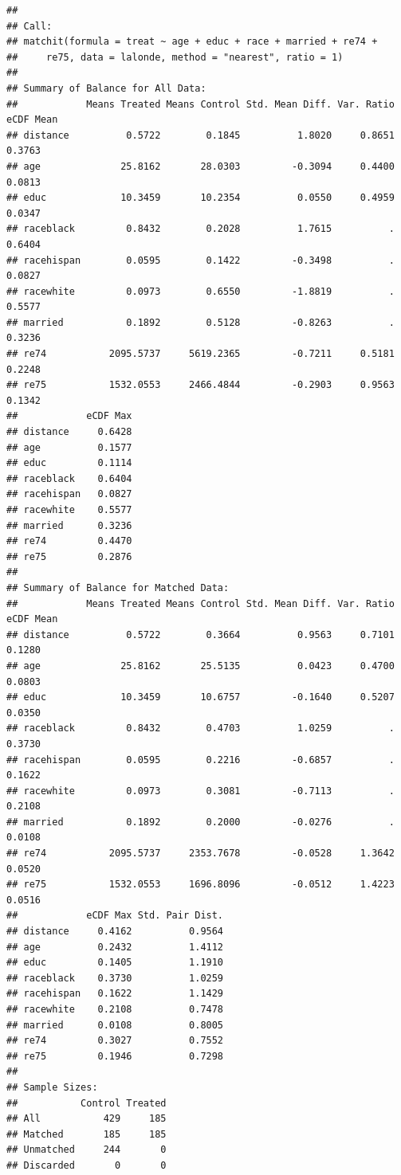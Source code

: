 \documentclass[
]{book}
\begin{document}
\begin{verbatim}
## 
## Call:
## matchit(formula = treat ~ age + educ + race + married + re74 + 
##     re75, data = lalonde, method = "nearest", ratio = 1)
## 
## Summary of Balance for All Data:
##            Means Treated Means Control Std. Mean Diff. Var. Ratio eCDF Mean
## distance          0.5722        0.1845          1.8020     0.8651    0.3763
## age              25.8162       28.0303         -0.3094     0.4400    0.0813
## educ             10.3459       10.2354          0.0550     0.4959    0.0347
## raceblack         0.8432        0.2028          1.7615          .    0.6404
## racehispan        0.0595        0.1422         -0.3498          .    0.0827
## racewhite         0.0973        0.6550         -1.8819          .    0.5577
## married           0.1892        0.5128         -0.8263          .    0.3236
## re74           2095.5737     5619.2365         -0.7211     0.5181    0.2248
## re75           1532.0553     2466.4844         -0.2903     0.9563    0.1342
##            eCDF Max
## distance     0.6428
## age          0.1577
## educ         0.1114
## raceblack    0.6404
## racehispan   0.0827
## racewhite    0.5577
## married      0.3236
## re74         0.4470
## re75         0.2876
## 
## Summary of Balance for Matched Data:
##            Means Treated Means Control Std. Mean Diff. Var. Ratio eCDF Mean
## distance          0.5722        0.3664          0.9563     0.7101    0.1280
## age              25.8162       25.5135          0.0423     0.4700    0.0803
## educ             10.3459       10.6757         -0.1640     0.5207    0.0350
## raceblack         0.8432        0.4703          1.0259          .    0.3730
## racehispan        0.0595        0.2216         -0.6857          .    0.1622
## racewhite         0.0973        0.3081         -0.7113          .    0.2108
## married           0.1892        0.2000         -0.0276          .    0.0108
## re74           2095.5737     2353.7678         -0.0528     1.3642    0.0520
## re75           1532.0553     1696.8096         -0.0512     1.4223    0.0516
##            eCDF Max Std. Pair Dist.
## distance     0.4162          0.9564
## age          0.2432          1.4112
## educ         0.1405          1.1910
## raceblack    0.3730          1.0259
## racehispan   0.1622          1.1429
## racewhite    0.2108          0.7478
## married      0.0108          0.8005
## re74         0.3027          0.7552
## re75         0.1946          0.7298
## 
## Sample Sizes:
##           Control Treated
## All           429     185
## Matched       185     185
## Unmatched     244       0
## Discarded       0       0
\end{verbatim}
\end{document}

